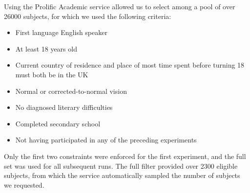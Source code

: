 Using the Prolific Academic service allowed us to select among a pool of
over \num{26000} subjects, for which we used the following criteria:

\begin{itemize}
\item
  First language English speaker
\item
  At least 18 years old
\item
  Current country of residence and place of most time spent before
  turning 18 must both be in the UK
\item
  Normal or corrected-to-normal vision
\item
  No diagnosed literary difficulties
\item
  Completed secondary school
\item
  Not having participated in any of the preceding experiments
\end{itemize}

Only the first two constraints were enforced for the first experiment,
and the full set was used for all subsequent runs. The full filter
provided over \num{2300} eligible subjects, from which the service
automatically sampled the number of subjects we requested.

